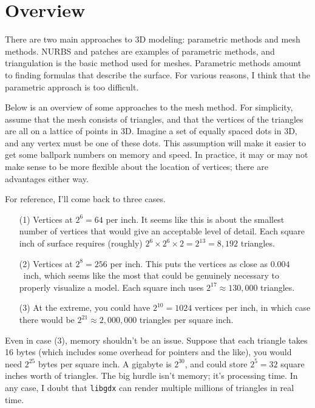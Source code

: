 \documentclass[titlepage,oneside,10pt]{article}
\begin{document}
\raggedbottom

\newcommand{\mymargin}[1]{\marginpar{\rm\tiny #1}}
\newcommand{\leftmar}[1]{\reversemarginpar \mymargin{#1}}


\section{Overview}

There are two main approaches to 3D modeling: parametric methods and
mesh methods. NURBS and patches are examples of parametric methods,
and triangulation is the basic method used for meshes. Parametric
methods amount to finding formulas that describe the surface. For
various reasons, I think that the parametric approach is too
difficult.

Below is an overview of some approaches to the mesh method. For
simplicity, assume that the mesh consists of triangles, and that the
vertices of the triangles are all on a lattice of points in 3D. Imagine
a set of equally spaced dots in 3D, and any vertex must be one of
these dots. This assumption will make it easier to get some ballpark
numbers on memory and speed. In practice, it may or may not make sense
to be more flexible about the location of vertices; there are
advantages either way.

For reference, I'll come back to three cases.
\begin{itemize}
\itemsep=0pt
\item[(1)] Vertices at $2^6 = 64$ per inch. It seems like this is about the
  smallest number of vertices that would give an acceptable level of
  detail. Each square inch of surface requires (roughly) $2^6\times
  2^6\times 2 = 2^{13} = 8,192$  triangles.
\item[(2)] Vertices at $2^8=256$ per inch. This puts the vertices as close as
  $0.004$~inch, which seems like the most that could be genuinely
  necessary to properly visualize a model. Each square inch uses
  $2^{17} \approx 130,000$ triangles.
\item[(3)] At the extreme, you could have $2^{10} =1024$ vertices per inch,
  in which case there would be $2^{21} \approx 2,000,000$ triangles
  per square inch.  
\end{itemize}
Even in case (3), memory shouldn't be an issue. Suppose that each
triangle takes 16 bytes (which includes some overhead
for pointers and the like), you would need $2^{25}$ bytes per square
inch. A gigabyte is $2^{30}$, and could store $2^5 = 32$ square inches
worth of triangles. The big hurdle isn't memory; it's processing time.
In any case, I doubt that {\tt libgdx} can render multiple millions of triangles
in real time.
\end{document}
